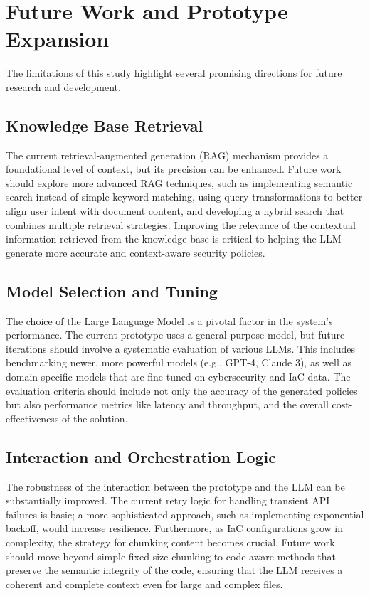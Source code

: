 \section{Future Work and Prototype Expansion}
\label{sec:future_work}

The limitations of this study highlight several promising directions for future research and development.

\subsection{Knowledge Base Retrieval}
The current retrieval-augmented generation (RAG) mechanism provides a foundational level of context, but its precision can be enhanced. Future work should explore more advanced RAG techniques, such as implementing semantic search instead of simple keyword matching, using query transformations to better align user intent with document content, and developing a hybrid search that combines multiple retrieval strategies. Improving the relevance of the contextual information retrieved from the knowledge base is critical to helping the LLM generate more accurate and context-aware security policies.

\subsection{Model Selection and Tuning}
The choice of the Large Language Model is a pivotal factor in the system's performance. The current prototype uses a general-purpose model, but future iterations should involve a systematic evaluation of various LLMs. This includes benchmarking newer, more powerful models (e.g., GPT-4, Claude 3), as well as domain-specific models that are fine-tuned on cybersecurity and IaC data. The evaluation criteria should include not only the accuracy of the generated policies but also performance metrics like latency and throughput, and the overall cost-effectiveness of the solution.

\subsection{Interaction and Orchestration Logic}
The robustness of the interaction between the prototype and the LLM can be substantially improved. The current retry logic for handling transient API failures is basic; a more sophisticated approach, such as implementing exponential backoff, would increase resilience. Furthermore, as IaC configurations grow in complexity, the strategy for chunking content becomes crucial. Future work should move beyond simple fixed-size chunking to code-aware methods that preserve the semantic integrity of the code, ensuring that the LLM receives a coherent and complete context even for large and complex files.


